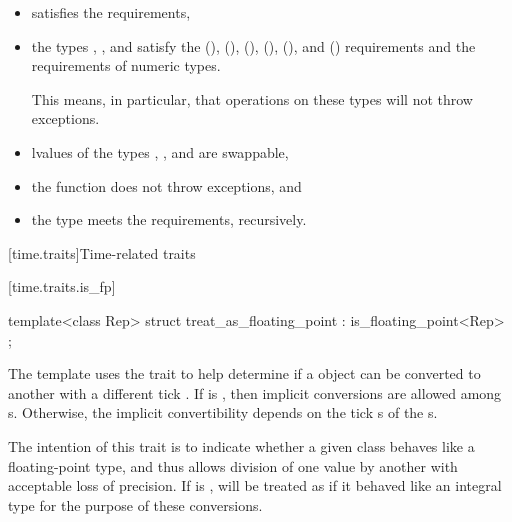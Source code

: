 \begin{itemize}
\item {} satisfies the  requirements,

\item the types , , and 
satisfy the  (),
 (),
 (),
 (),
 (), and
 () requirements and the requirements of
numeric types. \begin{note} This means, in particular,
that operations on these types will not throw exceptions. \end{note}

\item lvalues of the types , , and
 are swappable,

\item the function  does not throw exceptions, and

\item the type  meets the 
requirements, recursively.
\end{itemize}

[time.traits]{Time-related traits}

[time.traits.is_fp]{}

%
\begin{itemdecl}
template<class Rep> struct treat_as_floating_point : is_floating_point<Rep> { };
\end{itemdecl}

\pnum
The  template uses the  trait to
help determine if a  object can be converted to another
 with a different tick . If
 is , then implicit conversions
are allowed among s. Otherwise, the implicit convertibility
depends on the tick s of the s.
\begin{note}
The intention of this trait is to indicate whether a given class behaves like a floating-point
type, and thus allows division of one value by another with acceptable loss of precision. If
 is ,  will be treated as
if it behaved like an integral type for the purpose of these conversions.
\end{note}

